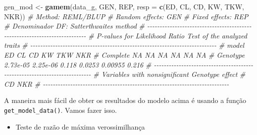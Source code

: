 \documentclass[
]{book}
\newenvironment{Shaded}{\begin{snugshade}}{\end{snugshade}}
\newcommand{\CommentTok}[1]{\textcolor[rgb]{0.56,0.35,0.01}{\textit{#1}}}
\newcommand{\DataTypeTok}[1]{\textcolor[rgb]{0.13,0.29,0.53}{#1}}
\newcommand{\KeywordTok}[1]{\textcolor[rgb]{0.13,0.29,0.53}{\textbf{#1}}}
\newcommand{\NormalTok}[1]{#1}
\newcommand{\StringTok}[1]{\textcolor[rgb]{0.31,0.60,0.02}{#1}}
\providecommand{\tightlist}{%
  \setlength{\itemsep}{0pt}\setlength{\parskip}{0pt}}
\numberwithin{equation}{section}
\begin{document}
\begin{Shaded}
\begin{Highlighting}[]
\NormalTok{gen\_mod \textless{}{-}}\StringTok{ }\KeywordTok{gamem}\NormalTok{(data\_g, GEN, REP,}
                 \DataTypeTok{resp =} \KeywordTok{c}\NormalTok{(ED, CL, CD, KW, TKW, NKR))}
\CommentTok{\# Method: REML/BLUP}
\CommentTok{\# Random effects: GEN}
\CommentTok{\# Fixed effects: REP}
\CommentTok{\# Denominador DF: Satterthwaite\textquotesingle{}s method}
\CommentTok{\# {-}{-}{-}{-}{-}{-}{-}{-}{-}{-}{-}{-}{-}{-}{-}{-}{-}{-}{-}{-}{-}{-}{-}{-}{-}{-}{-}{-}{-}{-}{-}{-}{-}{-}{-}{-}{-}{-}{-}{-}{-}{-}{-}{-}{-}{-}{-}{-}{-}{-}{-}{-}{-}{-}{-}{-}{-}{-}{-}{-}{-}{-}{-}{-}{-}{-}{-}{-}{-}{-}{-}{-}{-}{-}{-}}
\CommentTok{\# P{-}values for Likelihood Ratio Test of the analyzed traits}
\CommentTok{\# {-}{-}{-}{-}{-}{-}{-}{-}{-}{-}{-}{-}{-}{-}{-}{-}{-}{-}{-}{-}{-}{-}{-}{-}{-}{-}{-}{-}{-}{-}{-}{-}{-}{-}{-}{-}{-}{-}{-}{-}{-}{-}{-}{-}{-}{-}{-}{-}{-}{-}{-}{-}{-}{-}{-}{-}{-}{-}{-}{-}{-}{-}{-}{-}{-}{-}{-}{-}{-}{-}{-}{-}{-}{-}{-}}
\CommentTok{\#     model       ED       CL    CD     KW     TKW   NKR}
\CommentTok{\#  Complete       NA       NA    NA     NA      NA    NA}
\CommentTok{\#  Genotype 2.73e{-}05 2.25e{-}06 0.118 0.0253 0.00955 0.216}
\CommentTok{\# {-}{-}{-}{-}{-}{-}{-}{-}{-}{-}{-}{-}{-}{-}{-}{-}{-}{-}{-}{-}{-}{-}{-}{-}{-}{-}{-}{-}{-}{-}{-}{-}{-}{-}{-}{-}{-}{-}{-}{-}{-}{-}{-}{-}{-}{-}{-}{-}{-}{-}{-}{-}{-}{-}{-}{-}{-}{-}{-}{-}{-}{-}{-}{-}{-}{-}{-}{-}{-}{-}{-}{-}{-}{-}{-}}
\CommentTok{\# Variables with nonsignificant Genotype effect}
\CommentTok{\# CD NKR }
\CommentTok{\# {-}{-}{-}{-}{-}{-}{-}{-}{-}{-}{-}{-}{-}{-}{-}{-}{-}{-}{-}{-}{-}{-}{-}{-}{-}{-}{-}{-}{-}{-}{-}{-}{-}{-}{-}{-}{-}{-}{-}{-}{-}{-}{-}{-}{-}{-}{-}{-}{-}{-}{-}{-}{-}{-}{-}{-}{-}{-}{-}{-}{-}{-}{-}{-}{-}{-}{-}{-}{-}{-}{-}{-}{-}{-}{-}}
\end{Highlighting}
\end{Shaded}

A maneira mais fácil de obter os resultados do modelo acima é usando a função \texttt{get\_model\_data()}. Vamos fazer isso.

\begin{itemize}
\tightlist
\item
  Teste de razão de máxima verossimilhança
\end{itemize}
\end{document}
